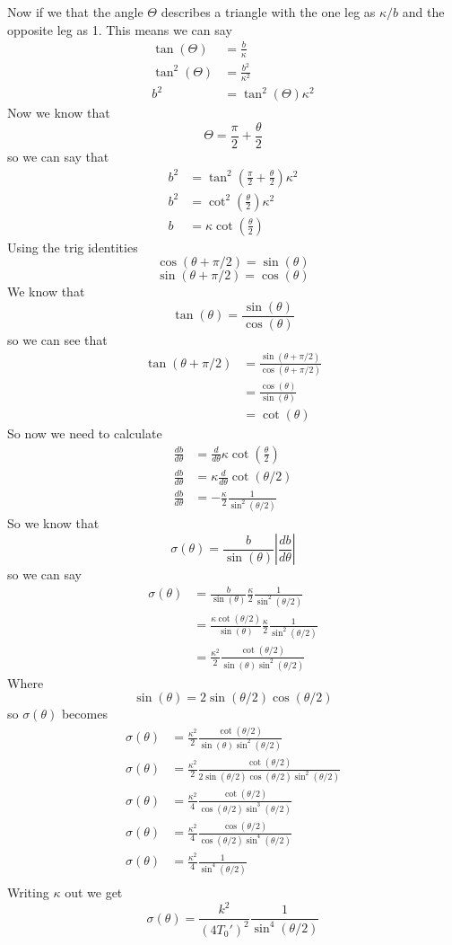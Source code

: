 \documentclass[11pt]{article}
\numberwithin{equation}{section}
\begin{document}
Now if we that the angle $\Theta$ describes a triangle with the one leg as $\kappa/b$ and the opposite leg as 1. This means we can say
\begin{align*}
\tan(\Theta) &= \frac{b}{\kappa}\\
\tan^2(\Theta) &= \frac{b^2}{\kappa^2}\\
{b^2} &= \tan^2(\Theta){\kappa^2}
\end{align*}
Now we know that 
$$\Theta = \frac{\pi}{2}+\frac{\theta}{2}$$
so we can say that
\begin{align*}
{b^2} &= \tan^2\left(\frac{\pi}{2}+\frac{\theta}{2}\right){\kappa^2}\\
{b^2} &= \cot^2\left(\frac{\theta}{2}\right){\kappa^2}\\
{b} &= {\kappa}\cot\left(\frac{\theta}{2}\right)
\end{align*}
Using the trig identities
$$\cos(\theta+\pi/2) = \sin(\theta)$$
$$\sin(\theta+\pi/2) = \cos(\theta)$$
We know that
$$\tan(\theta) = \frac{\sin(\theta)}{\cos(\theta)}$$
so we can see that
\begin{align*}
\tan(\theta+\pi/2) &= \frac{\sin(\theta+\pi/2)}{\cos(\theta+\pi/2)}\\
&= \frac{\cos(\theta)}{\sin(\theta)}\\
&= \cot(\theta)
\end{align*}
So now we need to calculate
\begin{align*}
\frac{db}{d\theta} &= \frac{d}{d\theta}{\kappa}\cot\left(\frac{\theta}{2}\right)\\
\frac{db}{d\theta} &= {\kappa}\frac{d}{d\theta}\cot(\theta/2)\\
\frac{db}{d\theta} &= -\frac{\kappa}{2}\frac{1}{\sin^2(\theta/2)}
\end{align*}
So we know that
$$\sigma(\theta) = \frac{b}{\sin(\theta)}\left|\frac{db}{d\theta}\right|$$
so we can say 
\begin{align*}
\sigma(\theta) &= \frac{b}{\sin(\theta)}\frac{\kappa}{2}\frac{1}{\sin^2(\theta/2)}\\
&= \frac{{\kappa}\cot(\theta/2)}{\sin(\theta)}\frac{\kappa}{2}\frac{1}{\sin^2(\theta/2)}\\
&= \frac{{\kappa^2}}{2}\frac{\cot(\theta/2)}{\sin(\theta)\sin^2(\theta/2)}
\end{align*}
Where
$$\sin(\theta) = 2\sin(\theta/2)\cos(\theta/2)$$
so $\sigma(\theta)$ becomes
\begin{align*}
\sigma(\theta) &= \frac{{\kappa^2}}{2}\frac{\cot(\theta/2)}{\sin(\theta)\sin^2(\theta/2)}\\
\sigma(\theta) &= \frac{{\kappa^2}}{2}\frac{\cot(\theta/2)}{2\sin(\theta/2)\cos(\theta/2)\sin^2(\theta/2)}\\
\sigma(\theta) &= \frac{{\kappa^2}}{4}\frac{\cot(\theta/2)}{\cos(\theta/2)\sin^3(\theta/2)}\\
\sigma(\theta) &= \frac{{\kappa^2}}{4}\frac{\cos(\theta/2)}{\cos(\theta/2)\sin^4(\theta/2)}\\
\sigma(\theta) &= \frac{{\kappa^2}}{4}\frac{1}{\sin^4(\theta/2)}\\
\end{align*}
Writing $\kappa$ out we get
$$\sigma(\theta) = \frac{{k^2}}{(4T_0')^2}\frac{1}{\sin^4(\theta/2)}$$
\end{document}
